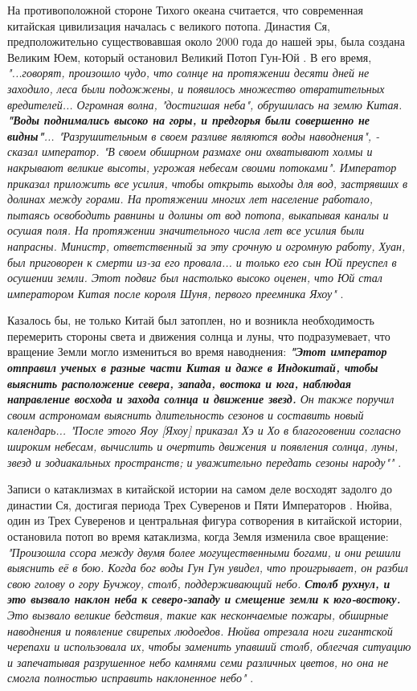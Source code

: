 \documentclass[10pt,twocolumn,letterpaper]{article}
\begin{document}
На противоположной стороне Тихого океана считается, что современная китайская цивилизация началась с великого потопа. Династия Ся, предположительно существовавшая около 2000 года до нашей эры, была создана Великим Юем, который остановил Великий Потоп Гун-Юй \cite{6}. В его время, \textit{"...говорят, произошло чудо, что солнце на протяжении десяти дней не заходило, леса были подожжены, и появилось множество отвратительных вредителей... Огромная волна, "достигшая неба", обрушилась на землю Китая. \textbf{"Воды поднимались высоко на горы, и предгорья были совершенно не видны"}... "Разрушительным в своем разливе являются воды наводнения", - сказал император. "В своем обширном размахе они охватывают холмы и накрывают великие высоты, угрожая небесам своими потоками". Император приказал приложить все усилия, чтобы открыть выходы для вод, застрявших в долинах между горами. На протяжении многих лет население работало, пытаясь освободить равнины и долины от вод потопа, выкапывая каналы и осушая поля. На протяжении значительного числа лет все усилия были напрасны. Министр, ответственный за эту срочную и огромную работу, Хуан, был приговорен к смерти из-за его провала... и только его сын Юй преуспел в осушении земли. Этот подвиг был настолько высоко оценен, что Юй стал императором Китая после короля Шуня, первого преемника Яхоу"} \cite{5}.

Казалось бы, не только Китай был затоплен, но и возникла необходимость перемерить стороны света и движения солнца и луны, что подразумевает, что вращение Земли могло измениться во время наводнения: \textit{\textbf{"Этот император отправил ученых в разные части Китая и даже в Индокитай, чтобы выяснить расположение севера, запада, востока и юга, наблюдая направление восхода и захода солнца и движение звезд.} Он также поручил своим астрономам выяснить длительность сезонов и составить новый календарь... "После этого Яоу [Яхоу] приказал Хэ и Хо в благоговении согласно широким небесам, вычислить и очертить движения и появления солнца, луны, звезд и зодиакальных пространств; и уважительно передать сезоны народу""} \cite{5}.

Записи о катаклизмах в китайской истории на самом деле восходят задолго до династии Ся, достигая периода Трех Суверенов и Пяти Императоров \cite{7}. Нюйва, один из Трех Суверенов и центральная фигура сотворения в китайской истории, остановила потоп во время катаклизма, когда Земля изменила свое вращение: \textit{"Произошла ссора между двумя более могущественными богами, и они решили выяснить её в бою. Когда бог воды Гун Гун увидел, что проигрывает, он разбил свою голову о гору Бучжоу, столб, поддерживающий небо. \textbf{Столб рухнул, и это вызвало наклон неба к северо-западу и смещение земли к юго-востоку.} Это вызвало великие бедствия, такие как нескончаемые пожары, обширные наводнения и появление свирепых людоедов. Нюйва отрезала ноги гигантской черепахи и использовала их, чтобы заменить упавший столб, облегчая ситуацию и запечатывая разрушенное небо камнями семи различных цветов, но она не смогла полностью исправить наклоненное небо"} \cite{8}.
\end{document}
